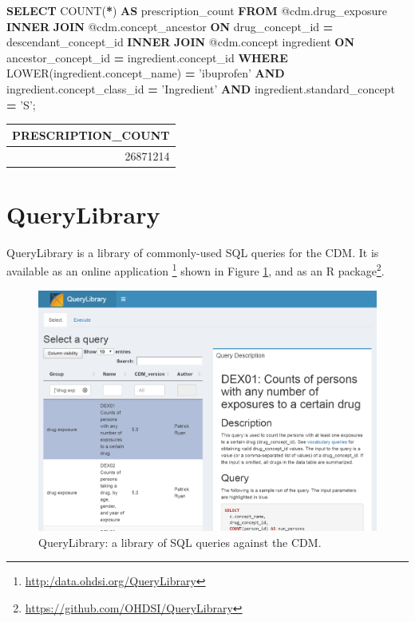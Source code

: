 \documentclass[11pt]{book}
\newenvironment{Shaded}{\begin{snugshade}}{\end{snugshade}}
\newcommand{\FunctionTok}[1]{\textcolor[rgb]{0.00,0.00,0.00}{#1}}
\newcommand{\KeywordTok}[1]{\textcolor[rgb]{0.13,0.29,0.53}{\textbf{#1}}}
\newcommand{\NormalTok}[1]{#1}
\newcommand{\OperatorTok}[1]{\textcolor[rgb]{0.81,0.36,0.00}{\textbf{#1}}}
\newcommand{\StringTok}[1]{\textcolor[rgb]{0.31,0.60,0.02}{#1}}
\let\rmarkdownfootnote\footnote%
\def\footnote{\protect\rmarkdownfootnote}
\theoremstyle{definition}
\theoremstyle{definition}
\theoremstyle{definition}
\theoremstyle{remark}
\begin{document}
\begin{Shaded}
\begin{Highlighting}[]
\KeywordTok{SELECT} \FunctionTok{COUNT}\NormalTok{(}\OperatorTok{*}\NormalTok{) }\KeywordTok{AS}\NormalTok{ prescription_count}
\KeywordTok{FROM}\NormalTok{ @cdm.drug_exposure}
\KeywordTok{INNER} \KeywordTok{JOIN}\NormalTok{ @cdm.concept_ancestor}
  \KeywordTok{ON}\NormalTok{ drug_concept_id }\OperatorTok{=}\NormalTok{ descendant_concept_id}
\KeywordTok{INNER} \KeywordTok{JOIN}\NormalTok{ @cdm.concept ingredient}
  \KeywordTok{ON}\NormalTok{ ancestor_concept_id }\OperatorTok{=}\NormalTok{ ingredient.concept_id}
\KeywordTok{WHERE} \FunctionTok{LOWER}\NormalTok{(ingredient.concept_name) }\OperatorTok{=} \StringTok{'ibuprofen'}
  \KeywordTok{AND}\NormalTok{ ingredient.concept_class_id }\OperatorTok{=} \StringTok{'Ingredient'}
  \KeywordTok{AND}\NormalTok{ ingredient.standard_concept }\OperatorTok{=} \StringTok{'S'}\NormalTok{;}
\end{Highlighting}
\end{Shaded}

\begin{longtable}[]{@{}r@{}}
\toprule
PRESCRIPTION\_COUNT\tabularnewline
\midrule
\endhead
26871214\tabularnewline
\bottomrule
\end{longtable}

\hypertarget{querylibrary}{%
\section{QueryLibrary}\label{querylibrary}}

QueryLibrary is a library of commonly-used SQL queries for the CDM. It is available as an online application \footnote{\url{http:/data.ohdsi.org/QueryLibrary}} shown in Figure \ref{fig:queryLibrary}, and as an R package\footnote{\url{https://github.com/OHDSI/QueryLibrary}}.

\begin{figure}

{\centering \includegraphics[width=1\linewidth]{images/SqlAndR/queryLibrary} 

}

\caption{QueryLibrary: a library of SQL queries against the CDM.}\label{fig:queryLibrary}
\end{figure}
\end{document}

